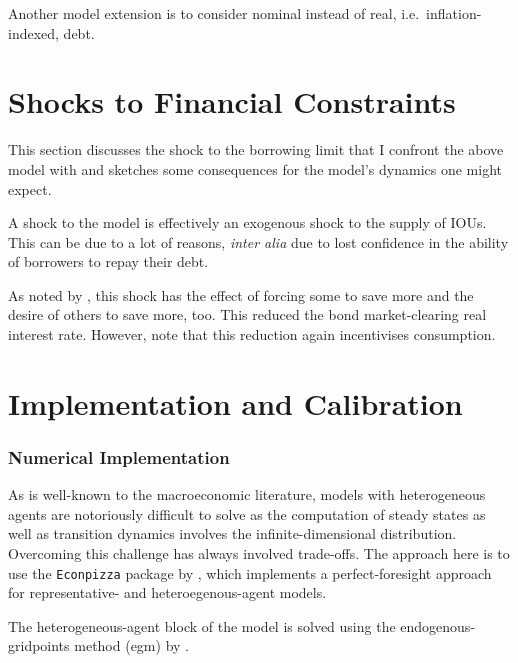 \documentclass[12pt]{article} %
\numberwithin{equation}{section} %
\begin{document}
Another model extension is to consider nominal instead of real, i.e.~inflation-indexed, debt. 

\section{Shocks to Financial Constraints}
\label{sec:shocks}

This section discusses the shock to the borrowing limit that I confront the above model with and sketches some consequences for the model's dynamics one might expect.

A shock to the model is effectively an exogenous shock to the supply of IOUs. This can be due to a lot of reasons, \textit{inter alia} due to lost confidence in the ability of borrowers to repay their debt.

As noted by \textcite{gl2017}, this shock has the effect of forcing some to save more and the desire of others to save more, too. This reduced the bond market-clearing real interest rate. However, note that this reduction again incentivises consumption.

\section{Implementation and Calibration}
\label{sec:implementation-calibration}

\subsubsection*{Numerical Implementation}
\label{sec:implementation}

As is well-known to the macroeconomic literature, models with heterogeneous agents are notoriously difficult to solve as the computation of steady states as well as transition dynamics involves the infinite-dimensional distribution. Overcoming this challenge has always involved trade-offs. The approach here is to use the \texttt{Econpizza} package by \textcite{boehl2023econpizza}, which implements a perfect-foresight approach for representative- and heteroegenous-agent models.

The heterogeneous-agent block of the model is solved using the endogenous-gridpoints method (\Gls{egm}) by \textcite{carroll2006}.
\end{document}
